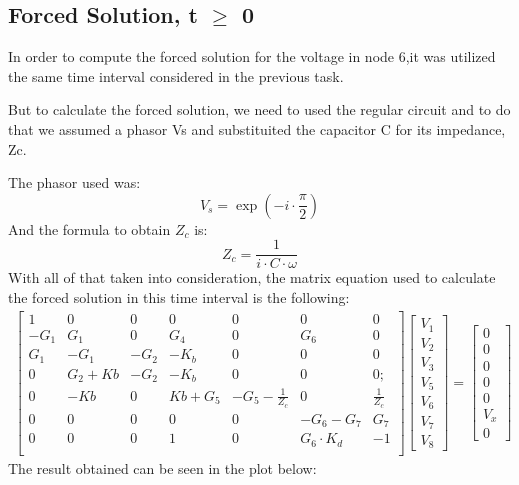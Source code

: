 \subsection{Forced Solution, t $\ge$ 0}
In order to compute the forced solution for the voltage in node 6,it was utilized the same time interval considered in the previous task.
\par But to calculate the forced solution, we need to used the regular circuit and to do that we assumed a phasor Vs and substituited the capacitor C for its impedance, Zc.
\par The phasor used was:
\begin{equation}
V_s = \exp(-i\cdot \frac{\pi}{2})
\end{equation}
And the formula to obtain $Z_c$ is:
\begin{equation}
Z_c= \frac{1}{i\cdot C \cdot \omega}
\end{equation}
With all of that taken into consideration, the matrix equation used to calculate the forced solution in this time interval is the following:
\begin{gather}
	\begin{bmatrix}
		1 & 0 & 0 & 0 & 0 & 0 & 0 \\
		-G_1 & G_1 & 0 & G_4 & 0 & G_6 & 0 \\
		G_1 & -G_1 & -G_2 & -K_b & 0 & 0 & 0 \\
		0 & G_2+Kb & -G_2 & -K_b & 0 & 0 & 0;\\
               0 & -Kb & 0 & Kb+G_5 & -G_5-\frac{1}{Z_c} & 0 & \frac{1}{Z_c} \\
               0 & 0 & 0 & 0 & 0 & -G_6-G_7 & G_7\\
               0 & 0 & 0 & 1 & 0 & G_6\cdot K_d &-1\\
	\end{bmatrix}
	\begin {bmatrix} V_1 \\ V_2 \\ V_3 \\ V_5  \\ V_6 \\ V_7 \\ V_8 \end{bmatrix}
	=
	\begin {bmatrix} 0  \\ 0  \\ 0  \\ 0 \\ 0  \\ V_x \\ 0 \end{bmatrix}
\end{gather}
The result obtained can be seen in the plot below:

